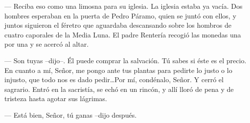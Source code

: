   --- Reciba eso como una limosna para su iglesia.
\pend
%
\pstart
  La iglesia estaba ya vacía. Dos hombres esperaban en la puerta de Pedro Páramo, quien se juntó con ellos, y juntos siguieron el féretro que aguardaba descansando sobre los hombros de cuatro caporales de la Media Luna.
\pend
%
\pstart
  El padre Rentería recogió las monedas una por una y se acercó al altar.

  --- Son tuyas --dijo--. Él puede comprar la salvación. Tú sabes si éste es el precio. En cuanto a mí, Señor, me pongo ante tus plantas para pedirte lo justo o lo injusto, que todo nos es dado pedir\ldots Por mí, condénalo, Señor.
\pend
%
\pstart
  Y cerró el sagrario.
\pend
%
\pstart
  Entró en la sacristía, se echó en un rincón, y allí lloró de pena y de tristeza
  hasta agotar sus lágrimas.

  --- Está bien, Señor, tú ganas --dijo después.
\pend
